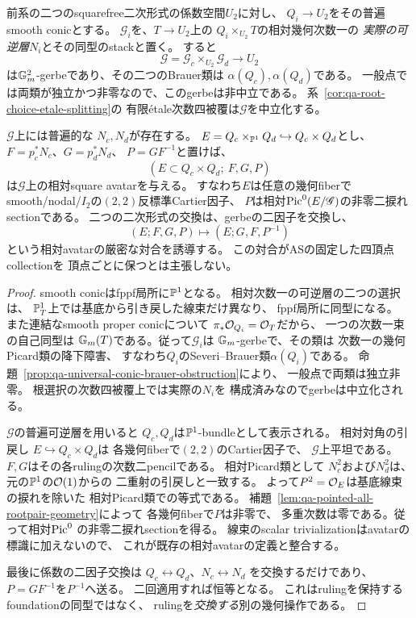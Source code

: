 \begin{theorem}
\label{thm:qa-brauer-gerbe-square-avatar}
前系の二つのsquarefree二次形式の係数空間$U_2$に対し、
$Q_i\to U_2$をその普遍smooth conicとする。
$\mathscr G_i$を、$T\to U_2$上の
$Q_i\times_{U_2}T$の相対幾何次数一の
\emph{実際の可逆層}$N_i$とその同型のstackと置く。
すると
\[
 \mathscr G=\mathscr G_c\times_{U_2}\mathscr G_d
 \longrightarrow U_2
\]
は$\mathbb G_m^2$-gerbeであり、その二つのBrauer類は
$\alpha(Q_c),\alpha(Q_d)$である。
一般点では両類が独立かつ非零なので、このgerbeは非中立である。
系~\ref{cor:qa-root-choice-etale-splitting}の
有限\'{e}tale次数四被覆は$\mathscr G$を中立化する。

$\mathscr G$上には普遍的な
$N_c,N_d$が存在する。
$E=Q_c\times_{\mathbb P^1}Q_d\hookrightarrow Q_c\times Q_d$とし、
$F=p_c^*N_c$、$G=p_d^*N_d$、
$P=GF^{-1}$と置けば、
\[
 (E\subset Q_c\times Q_d;\ F,G,P)
\]
は$\mathscr G$上の相対square avatarを与える。
すなわち$E$は任意の幾何fiberで
smooth/nodal/$I_2$の$(2,2)$反標準Cartier因子、
$P$は相対$\operatorname{Pic}^0(E/\mathscr G)$の非零二捩れsectionである。
二つの二次形式の交換は、gerbeの二因子を交換し、
\begin{equation}
 (E;F,G,P)\longmapsto(E;G,F,P^{-1})
 \label{eq:qa-gerbe-ruling-exchange}
\end{equation}
という相対avatarの厳密な対合を誘導する。
この対合がASの固定した四頂点collectionを
頂点ごとに保つとは主張しない。
\end{theorem}
\begin{proof}
smooth conicはfppf局所に$\mathbb P^1$となる。
相対次数一の可逆層の二つの選択は、
$\mathbb P^1_T$上では基底から引き戻した線束だけ異なり、
fppf局所に同型になる。
また連結なsmooth proper conicについて
$\pi_*\mathcal O_{Q_i}=\mathcal O_T$だから、
一つの次数一束の自己同型は
$\mathbb G_m(T)$である。従って$\mathscr G_i$は
$\mathbb G_m$-gerbeで、その類は
次数一の幾何Picard類の降下障害、
すなわち$Q_i$のSeveri--Brauer類$\alpha(Q_i)$である。
命題~\ref{prop:qa-universal-conic-brauer-obstruction}により、
一般点で両類は独立非零。
根選択の次数四被覆上では実際の$N_i$を
構成済みなのでgerbeは中立化される。

$\mathscr G$の普遍可逆層を用いると
$Q_c,Q_d$は$\mathbb P^1$-bundleとして表示される。
相対対角の引戻し
$E\hookrightarrow Q_c\times Q_d$は
各幾何fiberで$(2,2)$のCartier因子で、
$\mathscr G$上平坦である。
$F,G$はその各rulingの次数二pencilである。
相対Picard類として
$N_c^2$および$N_d^2$は、
元の$\mathbb P^1$の$\mathcal O(1)$からの
二重射の引戻しと一致する。
よって$P^2=\mathcal O_E$は基底線束の捩れを除いた
相対Picard類での等式である。
補題~\ref{lem:qa-pointed-all-rootpair-geometry}によって
各幾何fiberで$P$は非零で、
多重次数は零である。従って相対$\operatorname{Pic}^0$
の非零二捩れsectionを得る。
線束のscalar trivializationはavatarの標識に加えないので、
これが既存の相対avatarの定義と整合する。

最後に係数の二因子交換は
$Q_c\leftrightarrow Q_d$、$N_c\leftrightarrow N_d$
を交換するだけであり、
$P=GF^{-1}$を$P^{-1}$へ送る。
二回適用すれば恒等となる。
これはrulingを保持するfoundationの同型ではなく、
rulingを\emph{交換する}別の幾何操作である。
\end{proof}

